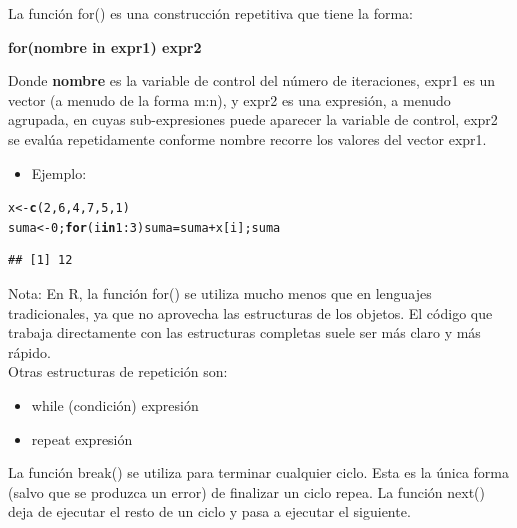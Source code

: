 \documentclass[12pt,letterpaper]{article}\usepackage[]{graphicx}\usepackage[]{color}
\makeatletter
\newcommand{\hlnum}[1]{\textcolor[rgb]{0.686,0.059,0.569}{#1}}%
\newcommand{\hlopt}[1]{\textcolor[rgb]{0,0,0}{#1}}%
\newcommand{\hlstd}[1]{\textcolor[rgb]{0.345,0.345,0.345}{#1}}%
\newcommand{\hlkwa}[1]{\textcolor[rgb]{0.161,0.373,0.58}{\textbf{#1}}}%
\newcommand{\hlkwb}[1]{\textcolor[rgb]{0.69,0.353,0.396}{#1}}%
\newcommand{\hlkwd}[1]{\textcolor[rgb]{0.737,0.353,0.396}{\textbf{#1}}}%
\newenvironment{kframe}{%
 \def\at@end@of@kframe{}%
 \ifinner\ifhmode%
  \def\at@end@of@kframe{\end{minipage}}%
  \begin{minipage}{\columnwidth}%
 \fi\fi%
 \def\FrameCommand##1{\hskip\@totalleftmargin \hskip-\fboxsep
 \colorbox{shadecolor}{##1}\hskip-\fboxsep
     \hskip-\linewidth \hskip-\@totalleftmargin \hskip\columnwidth}%
 \MakeFramed {\advance\hsize-\width
   \@totalleftmargin\z@ \linewidth\hsize
   \@setminipage}}%
 {\par\unskip\endMakeFramed%
 \at@end@of@kframe}
\newenvironment{knitrout}{}{} %
\makeatother
\begin{document}
La funci\'on for() es una construcci\'on repetitiva que tiene la forma:\\
\begin{center}
\textbf{for(nombre in expr1) expr2}\\
\end{center}
Donde \textbf{nombre} es la variable de control del n\'umero de iteraciones, expr1 es un vector (a menudo de la forma m:n), y expr2 es una expresi\'on, a menudo agrupada, en cuyas sub-expresiones puede aparecer la variable de control, expr2 se eval\'ua repetidamente conforme nombre recorre los valores del vector expr1. 


\begin{itemize}
\item Ejemplo:
\end {itemize}
\begin{knitrout}
\color{fgcolor}\begin{kframe}
\begin{alltt}
\hlstd{x} \hlkwb{<-} \hlkwd{c}\hlstd{(}\hlnum{2}\hlstd{,} \hlnum{6}\hlstd{,} \hlnum{4}\hlstd{,} \hlnum{7}\hlstd{,} \hlnum{5}\hlstd{,} \hlnum{1}\hlstd{)}
\hlstd{suma}\hlkwb{<-}\hlnum{0}\hlstd{;} \hlkwa{for}\hlstd{(i} \hlkwa{in} \hlnum{1}\hlopt{:}\hlnum{3}\hlstd{) suma} \hlkwb{=} \hlstd{suma}\hlopt{+}\hlstd{x[i]; suma}
\end{alltt}
\begin{verbatim}
## [1] 12
\end{verbatim}
\end{kframe}
\end{knitrout}

Nota: En R, la funci\'on for() se utiliza mucho menos que en lenguajes tradicionales, ya que no aprovecha las estructuras de los objetos. El c\'odigo que trabaja directamente con las estructuras completas suele ser m\'as claro y m\'as r\'apido.\\

Otras estructuras de repetici\'on son:

\begin{itemize}
\item while (condici\'on) expresi\'on
\item repeat expresi\'on 
\end{itemize}

La funci\'on break() se utiliza para terminar cualquier ciclo. Esta es la \'unica forma (salvo que se produzca un error) de finalizar un ciclo repea. La funci\'on next() deja de ejecutar el resto de un ciclo y pasa a ejecutar el siguiente.\\
\end{document}
